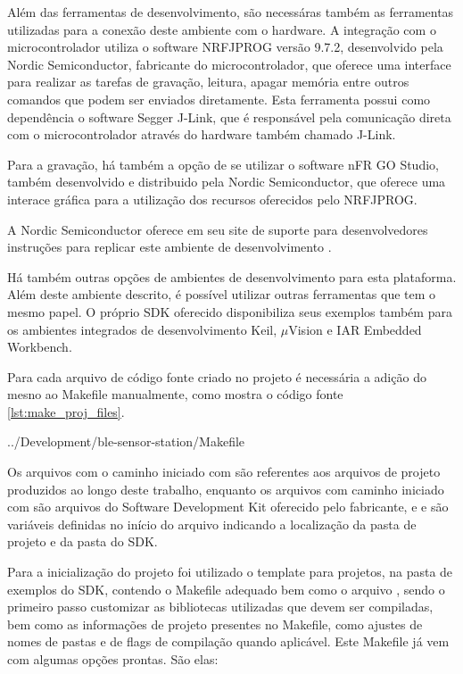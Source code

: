 Além das ferramentas de desenvolvimento, são necessáras também as ferramentas
utilizadas para a conexão deste ambiente com o hardware. A integração com o
microcontrolador utiliza o software NRFJPROG versão 9.7.2, desenvolvido pela
Nordic Semiconductor, fabricante do microcontrolador, que oferece uma interface
para realizar as tarefas de gravação, leitura, apagar memória entre outros
comandos que podem ser enviados diretamente. Esta ferramenta possui como
dependência o software Segger J-Link, que é responsável pela comunicação direta
com o microcontrolador através do hardware também chamado J-Link.

Para a gravação, há também a opção de se utilizar o
software nFR GO Studio, também desenvolvido e distribuido pela Nordic
Semiconductor, que oferece uma interace gráfica para a utilização dos
recursos oferecidos pelo NRFJPROG.

A Nordic Semiconductor oferece em seu site de suporte para desenvolvedores 
instruções para replicar este ambiente de desenvolvimento
\cite{devzoneGccEclipse}. 

Há também outras opções de ambientes de desenvolvimento para esta plataforma.
Além deste ambiente descrito, é possível utilizar outras ferramentas que tem o
mesmo papel. O próprio SDK oferecido disponibiliza seus exemplos também para os
ambientes integrados de desenvolvimento Keil, $\mu$Vision e IAR Embedded
Workbench. 

Para cada arquivo de código fonte criado no projeto é necessária a adição do
mesno ao Makefile manualmente, como mostra o código fonte
\ref{lst:make_proj_files}.

\begin{minipage}{0.95\linewidth}

{../Development/ble-sensor-station/Makefile}
\end{minipage}

Os arquivos com o caminho iniciado com  são referentes
aos arquivos de projeto produzidos ao longo deste trabalho, enquanto os arquivos
com caminho iniciado com  são arquivos do Software
Development Kit oferecido pelo fabricante, e  e
 são variáveis definidas no início do arquivo indicando
a localização da pasta de projeto e da pasta do SDK.

Para a inicialização do projeto foi utilizado o template para projetos, na pasta
de exemplos do SDK, contendo o Makefile adequado bem como o arquivo
, sendo o primeiro passo customizar as bibliotecas utilizadas
que devem ser compiladas, bem como as informações de projeto presentes no
Makefile, como ajustes de nomes de pastas e de flags de compilação quando
aplicável. Este Makefile já vem com algumas opções prontas. São elas:

